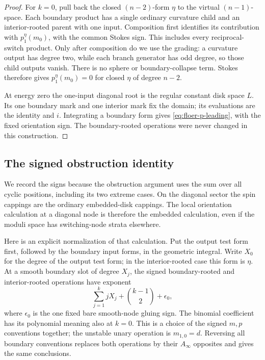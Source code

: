 \documentclass[11pt]{article}
\numberwithin{equation}{section}
\theoremstyle{definition}
\theoremstyle{remark}
\begin{document}
\begin{proof}
For $k=0$, pull back the closed $(n-2)$-form $\eta$ to the virtual
$(n-1)$-space.  Each boundary product has a single ordinary
curvature child and an interior-rooted parent with one input.
Composition first identifies its contribution with
$p_1^\eta(m_0)$, with the common Stokes sign.  This includes every
reciprocal-switch product.  Only after composition do we use the
grading: a curvature output has degree two, while each branch
generator has odd degree, so those child outputs vanish.
There is no sphere or boundary-collapse term.  Stokes therefore gives
$p_1^\eta(m_0)=0$ for closed $\eta$ of degree $n-2$.

At energy zero the one-input diagonal root is the regular constant
disk space $L$.  Its one boundary mark and one interior mark fix
the domain; its evaluations are the identity and $i$.  Integrating
a boundary form gives
\eqref{eq:floer-p-leading}, with the fixed orientation sign.  The
boundary-rooted operations were never changed in this construction.
\end{proof}

\subsection{The signed obstruction identity}

We record the signs because the obstruction argument uses the sum over
all cyclic positions, including its two extreme cases.  On the
diagonal sector the spin cappings are the ordinary embedded-disk
cappings.  The local orientation calculation at a diagonal node is
therefore the embedded calculation, even if the moduli space has
switching-node strata elsewhere.

Here is an explicit normalization of that calculation.  Put the
output test form first, followed by the boundary input forms, in the
geometric integral.  Write $X_0$ for the degree of the output test
form; in the interior-rooted case this form is $\eta$.
At a smooth boundary slot of degree $X_j$, the
signed boundary-rooted and interior-rooted operations have exponent
\begin{equation}
 \label{eq:floer-p-sign}
 \sum_{j=1}^k jX_j+\binom{k-1}{2}+\epsilon_0,
\end{equation}
where $\epsilon_0$ is the one fixed bare smooth-node gluing sign.  The
binomial coefficient has its polynomial meaning also at $k=0$.
This is a choice of the signed $m,p$ conventions together; the unstable
unary operation is $m_{1,0}=d$.  Reversing all boundary conventions
replaces both operations by their $A_\infty$ opposites and gives the
same conclusions.
\end{document}
